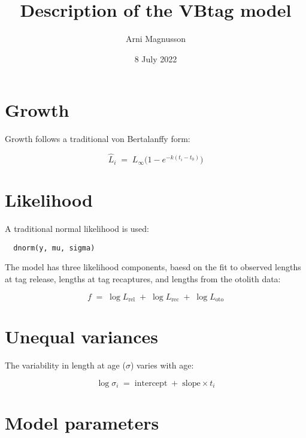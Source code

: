 \documentclass[fleqn]{article}
\begin{document}
\title{Description of the VBtag model}
\author{Arni Magnusson}
\date{8 July 2022}
\maketitle

\section*{Growth}

Growth follows a traditional von Bertalanffy form:

\begin{displaymath}
  \hat L_i \;=\; L_\infty \Big(1-e^{-k(t_i-t_0)}\Big)
\end{displaymath}

\section*{Likelihood}

A traditional normal likelihood is used:

\begin{verbatim}
  dnorm(y, mu, sigma)
\end{verbatim}

\vspace{1ex}

The model has three likelihood components, baesd on the fit to observed lengths
at tag release, lengths at tag recaptures, and lengths from the otolith data:

\begin{displaymath}
  f \;=\; \log L_\mathrm{rel}
  \;+\; \log L_\mathrm{rec}
  \;+\; \log L_\mathrm{oto}
\end{displaymath}

\section*{Unequal variances}

The variability in length at age ($\sigma$) varies with age:

\begin{displaymath}
  \log\sigma_i \;=\; \mathrm{intercept} \;+\; \mathrm{slope} \times t_i
\end{displaymath}

\section*{Model parameters}
\end{document}

